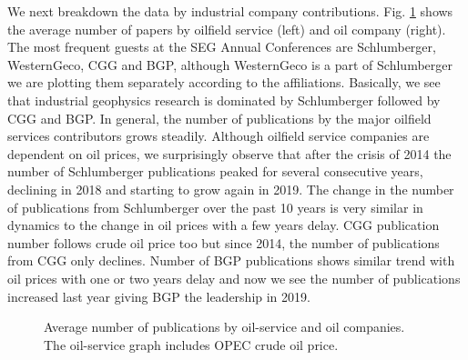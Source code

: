\documentclass[geosciences,article,submit,moreauthors,pdftex]{Definitions/mdpi}
\begin{document}
We next breakdown the data by industrial company contributions. Fig. \ref{oil_and_serv} shows the average number of papers by oilfield service (left) and oil company (right). The most frequent guests at the SEG Annual Conferences are Schlumberger, WesternGeco, CGG and BGP, although WesternGeco is a part of Schlumberger we are plotting them separately according to the affiliations. Basically, we see that industrial geophysics research is dominated by Schlumberger followed by CGG and BGP. In general, the number of publications by the major oilfield services contributors grows steadily. Although oilfield service companies are dependent on oil prices, we surprisingly observe that after the crisis of 2014 the number of Schlumberger publications peaked for several consecutive years, declining in 2018 and starting to grow again in 2019. The change in the number of publications from Schlumberger over the past 10 years is very similar in dynamics to the change in oil prices with a few years delay. CGG publication number follows crude oil price too but since 2014, the number of publications from CGG only declines. Number of BGP publications shows similar trend with oil prices with one or two years delay and now we see the number of publications increased last year giving BGP the leadership in 2019.

\begin{figure}[ht!]

\begin{minipage}{0.47\linewidth}
\end{minipage}
\hfill
\begin{minipage}{0.51\linewidth}
\end{minipage}

\caption{Average number of publications by oil-service and oil companies. The oil-service graph includes OPEC crude oil price.}
\label{oil_and_serv}
\end{figure}
\end{document}

